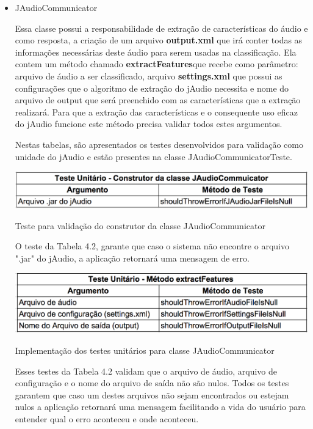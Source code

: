 \begin{itemize}
	\item JAudioCommunicator

Essa classe possui a responsabilidade de extração de características do áudio e como resposta, a criação de um arquivo \textbf{output.xml}  que irá conter todas as informações necessárias deste áudio para serem usadas na classificação.  Ela contem um método chamado \textbf{extractFeatures}que recebe como parâmetro: arquivo de áudio a ser classificado, arquivo \textbf{settings.xml} que possui as configurações que o algoritmo de extração do jAudio necessita e nome do arquivo de output que será preenchido com as características que a extração realizará.  Para que a extração das características e o consequente uso eficaz do jAudio funcione este método precisa validar todos estes argumentos.

Nestas tabelas, são apresentados os testes desenvolvidos para validação como unidade do jAudio e estão presentes na classe JAudioCommunicatorTeste.
\begin{table}[H]
	\centering
	\captionsetup{justification=centering,margin=2cm}
	\includegraphics[scale=0.65]{capitulos/validacao/figuras/testeConstrutorJAudioCommunicator.eps}
	\caption{Teste para validação do construtor da classe JAudioCommunicator}
	\label{fig:result-engajamento}
\end{table}
	
O teste da Tabela 4.2, garante que caso o sistema não encontre o arquivo ".jar" do jAudio, a aplicação retornará uma mensagem de erro. 
\begin{table}[H]
	\centering
	\captionsetup{justification=centering,margin=2cm}
	\includegraphics[scale=0.65]{capitulos/validacao/figuras/testeUniJaudioCommunicator.eps}
	\caption{Implementação dos testes unitários para classe JAudioCommunicator}
	\label{fig:result-engajamento}
\end{table}

Esses testes da Tabela 4.2  validam que o arquivo de áudio, arquivo de configuração e o nome do arquivo de saída não são nulos. Todos os testes garantem que caso um destes arquivos não sejam encontrados ou estejam nulos a aplicação retornará uma mensagem facilitando a vida do usuário para entender qual o erro aconteceu e onde aconteceu. 


\end{itemize}
